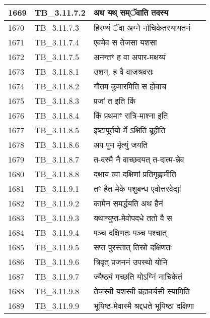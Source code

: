\documentclass[17pt]{extarticle}
\begin{document}
\begin{longtable}{||p{0.4in}||p{0.9in}||p{4.0in}||p{0.9in}||}
        \hline
            1669 & TB\_3.11.7.2 & अथ यथ् सम्ॅवाति तदस्य &      \\
        \hline
            1670 & TB\_3.11.7.3 & हिरण्यं ॅवा अग्ने र्नाचिकेतस्यायतनं &      \\
        \hline
            1671 & TB\_3.11.7.4 & एवमेव स तेजसा यशसा &      \\
        \hline
            1672 & TB\_3.11.7.5 & अनन्तꣳ ह वा अपार{-}मक्षय्यं &      \\
        \hline
            1673 & TB\_3.11.8.1 & उशन्. ह वै वाजश्रवसः &      \\
        \hline
            1674 & TB\_3.11.8.2 & गौतम कुमारमिति स होवाच &      \\
        \hline
            1675 & TB\_3.11.8.3 & प्रजां त इति किं &      \\
        \hline
            1676 & TB\_3.11.8.4 & किं प्रथमाꣳ रात्रि{-}माश्ना इति &      \\
        \hline
            1677 & TB\_3.11.8.5 & इष्टापूर्तयो र्मे ऽक्षितिं ब्रूहीति &      \\
        \hline
            1678 & TB\_3.11.8.6 & अप पुन र्मृत्युं जयति &      \\
        \hline
            1679 & TB\_3.11.8.7 & त{-}दस्मै नै वाच्छदयत् त{-}दात्म{-}न्नेव &      \\
        \hline
            1680 & TB\_3.11.8.8 & दक्षाय त्वा दक्षिणां प्रतिगृह्णामीति &      \\
        \hline
            1681 & TB\_3.11.9.1 & तꣳ हैत{-}मेके पशुबन्ध एवोत्तरवेद्यां &      \\
        \hline
            1682 & TB\_3.11.9.2 & कामेन समर्द्धयति अथ हैनं &      \\
        \hline
            1683 & TB\_3.11.9.3 & यथान्युप्त{-}मेवोपदधे ततो वै स &      \\
        \hline
            1684 & TB\_3.11.9.4 & पञ्च दक्षिणतः पञ्च पश्चात् &      \\
        \hline
            1685 & TB\_3.11.9.5 & सप्त पुरस्तात् तिस्रो दक्षिणतः &      \\
        \hline
            1686 & TB\_3.11.9.6 & त्रिवृत् प्रजननं उपस्थो योनि &      \\
        \hline
            1687 & TB\_3.11.9.7 & ज्यैष्ठ्यं गच्छति योऽग्निं नाचिकेतं &      \\
        \hline
            1688 & TB\_3.11.9.8 & तेजस्वी यशस्वी ब्रह्मवर्चसी स्यामिति &      \\
        \hline
            1689 & TB\_3.11.9.9 & भूयिष्ठ{-}मेवास्मै श्रद्दधते भूयिष्ठा दक्षिणा &      \\

\end{longtable}
\end{document}
